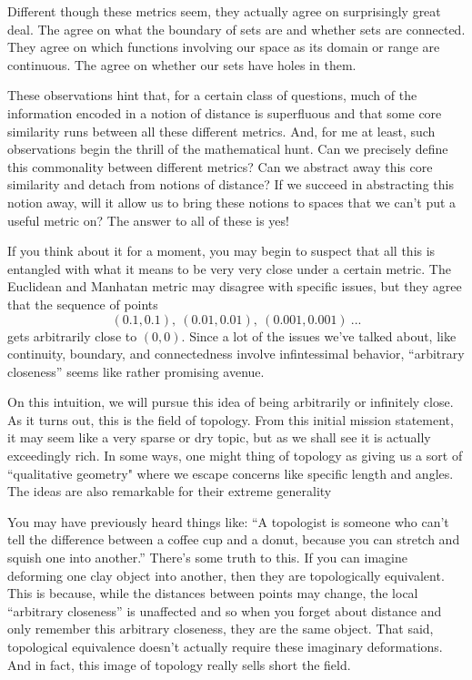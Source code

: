 \documentclass{report}
\begin{document}
Different though these metrics seem, they actually agree on surprisingly great deal. The agree on what the boundary of sets are and whether sets are connected. They agree on which functions involving our space as its domain or range are continuous. The agree on whether our sets have holes in them.

These observations hint that, for a certain class of questions, much of the information encoded in a notion of distance is superfluous and that some core similarity runs between all these different metrics. And, for me at least, such observations begin the thrill of the mathematical hunt. Can we precisely define this commonality between different metrics? Can we abstract away this core similarity and detach from notions of distance? If we succeed in abstracting this notion away, will it allow us to bring these notions to spaces that we can't put a useful metric on? The answer to all of these is yes!

If you think about it for a moment, you may begin to suspect that all this is entangled with what it means to be very very close under a certain metric. The Euclidean and Manhatan metric may disagree with specific issues, but they agree that the sequence of points $$(0.1,0.1), ~ (0.01,0.01), ~ (0.001,0.001) ~...$$ gets arbitrarily close to $(0,0)$. Since a lot of the issues we've talked about, like continuity, boundary, and connectedness involve infintessimal behavior, ``arbitrary closeness'' seems like rather promising avenue.

On this intuition, we will pursue this idea of being arbitrarily or infinitely close. As it turns out, this is the field of topology. From this initial mission statement, it may seem like a very sparse or dry topic, but as we shall see it is actually exceedingly rich. In some ways, one might thing of topology as giving us a sort of ``qualitative geometry" where we escape concerns like specific length and angles. The ideas are also remarkable for their extreme generality

You may have previously heard things like: ``A topologist is someone who can't tell the difference between a coffee cup and a donut, because you can stretch and squish one into another.'' There's some truth to this. If you can imagine deforming one clay object into another, then they are topologically equivalent. This is because, while the distances between points may change, the local ``arbitrary closeness'' is unaffected and so when you forget about distance and only remember this arbitrary closeness, they are the same object. That said, topological equivalence doesn't actually require these imaginary deformations. And in fact, this image of topology really sells short the field.
\end{document}
